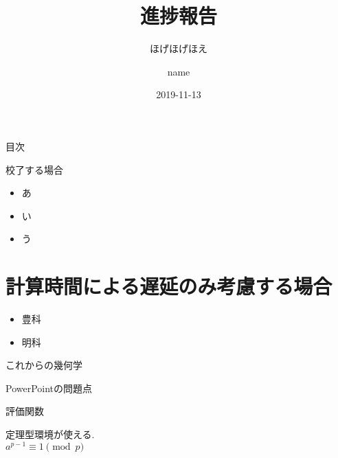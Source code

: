 \documentclass[uplatex, dvipdfmx, cjk, aspectratio=43]{beamer}
\begin{document}
\title{進捗報告}
\subtitle{ほげほげほえ}
\author{name}
\date{2019-11-13}


\begin{frame}
    \titlepage
\end{frame}


\begin{frame}{目次}
    \tableofcontents
\end{frame}


\begin{frame}{校了する場合}
    \begin{itemize}
        \item あ
        \item い
        \item う
    \end{itemize}
\end{frame}


\section{計算時間による遅延のみ考慮する場合}
\begin{frame}
    \begin{itemize}                %
        \item 豊科\pause           %
        \item 明科
    \end{itemize}


    \begin{block}{これからの幾何学}
    \end{block}
    \begin{alertblock}{PowerPointの問題点}
    \end{alertblock}
    \begin{exampleblock}{評価関数}
    \end{exampleblock}


    \begin{theorem}[Fermat]
        定理型環境が使える.\\
        $a^{p-1} \equiv 1 \pmod{p}$
    \end{theorem}

\end{frame}


\begin{frame}[allowframebreaks]
    ~\cite{kashima2019}
    ~\cite{ito2018}
    
    
\end{frame}

\end{document}
